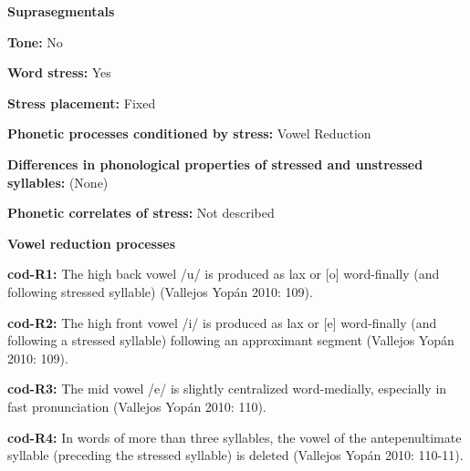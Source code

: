 \begin{styleBody}
\textbf{Suprasegmentals}
\end{styleBody}

\begin{styleBody}
\textbf{Tone:} No
\end{styleBody}

\begin{styleBody}
\textbf{Word stress:} Yes
\end{styleBody}

\begin{styleBody}
\textbf{Stress placement:} Fixed
\end{styleBody}

\begin{styleBody}
\textbf{Phonetic processes conditioned by stress:} Vowel Reduction
\end{styleBody}

\begin{styleBody}
\textbf{Differences in phonological properties of stressed and unstressed syllables:} (None)
\end{styleBody}

\begin{styleBody}
\textbf{Phonetic correlates of stress: }Not described
\end{styleBody}

\begin{styleBody}
\textbf{Vowel reduction processes}
\end{styleBody}

\begin{styleBody}
\textbf{cod-R1:} The high back vowel /u/ is produced as lax or [o] word-finally (and following stressed syllable) (Vallejos Yopán 2010: 109).
\end{styleBody}

\begin{styleBody}
\textbf{cod-R2:} The high front vowel /i/ is produced as lax or [e] word-finally (and following a stressed syllable) following an approximant segment (Vallejos Yopán 2010: 109).
\end{styleBody}

\begin{styleBody}
\textbf{cod-R3: }The mid vowel /e/ is slightly centralized word-medially, especially in fast pronunciation (Vallejos Yopán 2010: 110).
\end{styleBody}

\begin{styleBody}
\textbf{cod-R4: }In words of more than three syllables, the vowel of the antepenultimate syllable (preceding the stressed syllable) is deleted (Vallejos Yopán 2010: 110-11).
\end{styleBody}

